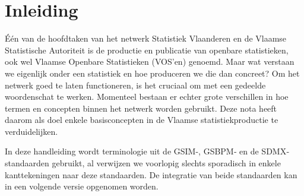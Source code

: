 \documentclass[\maindir/00_handleiding_statistiekproductie.tex]{subfiles}
\begin{document}
	
	
\chapter*{Inleiding}





Één van de hoofdtaken van het netwerk Statistiek Vlaanderen en de Vlaamse Statistische Autoriteit is de productie en publicatie van openbare statistieken, ook wel Vlaamse Openbare Statistieken (VOS'en) genoemd. Maar wat verstaan we eigenlijk onder een statistiek en hoe produceren we die dan concreet? Om het netwerk goed te laten functioneren, is het cruciaal om met een gedeelde woordenschat te werken. Momenteel bestaan er echter grote verschillen in hoe termen en concepten binnen het netwerk worden gebruikt. Deze nota heeft daarom als doel enkele basisconcepten in de Vlaamse statistiekproductie te verduidelijken.

In deze handleiding wordt terminologie uit de GSIM-, GSBPM‐ en de SDMX‐standaarden gebruikt, al verwijzen we voorlopig slechts sporadisch in enkele kanttekeningen naar deze standaarden. De integratie van beide standaarden kan in een volgende versie opgenomen worden.
\end{document}
